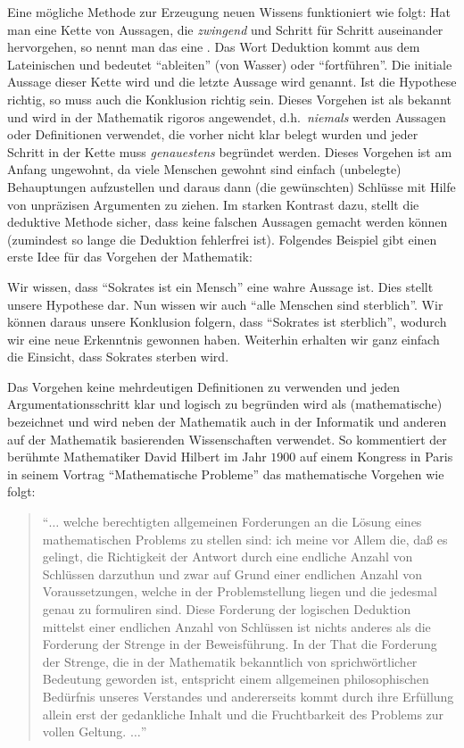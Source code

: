Eine mögliche Methode zur Erzeugung neuen Wissens funktioniert wie folgt: Hat man 
eine Kette von Aussagen, die \emph{zwingend} und
Schritt für Schritt auseinander hervorgehen, so nennt man das eine
. Das Wort Deduktion kommt aus dem Lateinischen und
bedeutet "`ableiten"' (von Wasser) oder "`fortführen"'. Die initiale Aussage
dieser Kette wird  und die letzte Aussage wird
 genannt. Ist die Hypothese richtig, so muss auch
die Konklusion richtig sein. Dieses Vorgehen ist als 
 bekannt und wird in der Mathematik rigoros 
angewendet, d.h.~\emph{niemals} werden Aussagen oder Definitionen verwendet, die
vorher nicht klar belegt wurden und jeder Schritt in der Kette muss \emph{genauestens}
begründet werden. Dieses Vorgehen ist am Anfang ungewohnt, da 
viele Menschen gewohnt sind einfach (unbelegte) Behauptungen aufzustellen und
daraus dann (die gewünschten) Schlüsse mit Hilfe von unpräzisen Argumenten zu ziehen.  
Im starken Kontrast dazu, stellt die deduktive Methode sicher, dass keine falschen 
Aussagen gemacht werden können (zumindest so lange die Deduktion fehlerfrei ist). 
Folgendes Beispiel gibt einen erste Idee für das Vorgehen der Mathematik:

Wir wissen, dass "`Sokrates ist ein Mensch"' eine wahre Aussage
ist. Dies stellt unsere Hypothese dar. Nun wissen wir auch "`alle
Menschen sind sterblich"'. Wir können daraus unsere Konklusion
folgern, dass "`Sokrates ist sterblich"', wodurch wir eine neue
Erkenntnis gewonnen haben. Weiterhin erhalten wir ganz einfach die Einsicht, dass
Sokrates sterben wird.

Das Vorgehen keine mehrdeutigen Definitionen zu verwenden und jeden
Argumentationsschritt klar und logisch zu begründen wird als
(mathematische)  bezeichnet und wird neben der
Mathematik auch in der Informatik und anderen auf der Mathematik
basierenden Wissenschaften verwendet. So kommentiert der berühmte
Mathematiker David Hilbert im Jahr $1900$ auf einem Kongress in Paris in
seinem Vortrag "`Mathematische Probleme"' das mathematische Vorgehen
wie folgt:

\begin{quote}
"`$\ldots$ welche berechtigten allgemeinen Forderungen an die Lösung
eines mathematischen Problems zu stellen sind: ich meine vor Allem
die, daß es gelingt, die Richtigkeit der Antwort durch eine endliche
Anzahl von Schlüssen darzuthun und zwar auf Grund einer endlichen
Anzahl von Voraussetzungen, welche in der Problemstellung liegen und
die jedesmal genau zu formuliren sind. Diese Forderung der logischen
Deduktion mittelst einer endlichen Anzahl von Schlüssen ist nichts
anderes als die Forderung der Strenge in der Beweisführung. In der
That die Forderung der Strenge, die in der Mathematik bekanntlich von
sprichwörtlicher Bedeutung geworden ist, entspricht einem allgemeinen
philosophischen Bedürfnis unseres Verstandes und andererseits kommt
durch ihre Erfüllung allein erst der gedankliche Inhalt und die
Fruchtbarkeit des Problems zur vollen Geltung. $\dots$"'
\end{quote}

